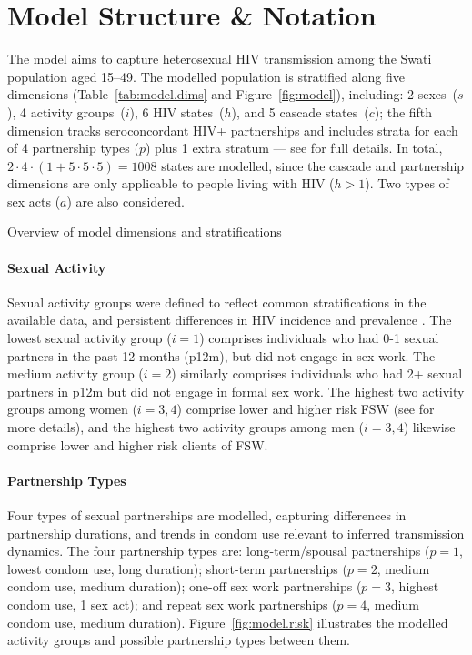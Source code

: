 \section{Model Structure \& Notation}\label{mod.str}
The model aims to capture heterosexual HIV transmission among the Swati population aged 15--49.
The modelled population is stratified along five dimensions
(Table~\ref{tab:model.dims} and Figure~\ref{fig:model}), including:
2 sexes~($s$), 4 activity groups~($i$), 6 HIV states~($h$), and 5 cascade states~($c$);
the fifth dimension tracks seroconcordant HIV+ partnerships
and includes strata for each of 4 partnership types ($p$) plus 1 extra stratum
--- see  for full details.
In total, $2 \cdot 4 \cdot (1 + 5 \cdot 5 \cdot 5) = 1008$ states are modelled,
since the cascade and partnership dimensions are only applicable to people living with HIV ($h>1$).
Two types of sex acts ($a$) are also considered.
\begin{table}[h]
  \centering
  \caption{Overview of model dimensions and stratifications}
  \label{tab:model.dims}
  
\end{table}

\paragraph{Sexual Activity}
Sexual activity groups were defined to reflect common stratifications in the available data,
and persistent differences in HIV incidence and prevalence
\cite{SDHS2006,Bicego2013,Justman2016,SHIMS2}.
The lowest sexual activity group ($i=1$) comprises
individuals who had 0-1 sexual partners in the past 12 months (p12m),
but did not engage in sex work.
The medium activity group ($i=2$) similarly comprises
individuals who had 2+ sexual partners in p12m
but did not engage in formal sex work.
The highest two activity groups among women ($i=3,4$) comprise
lower and higher risk FSW (see  for more details), and
the highest two activity groups among men ($i=3,4$) likewise comprise
lower and higher risk clients of FSW.
\paragraph{Partnership Types}
Four types of sexual partnerships are modelled,
capturing differences in partnership durations, and
trends in condom use relevant to inferred transmission dynamics.
The four partnership types are:
long-term/spousal partnerships ($p=1$, lowest condom use, long duration);
short-term partnerships ($p=2$, medium condom use, medium duration);
one-off sex work partnerships ($p=3$, highest condom use, 1 sex act);
and repeat sex work partnerships ($p=4$, medium condom use, medium duration).
Figure~\ref{fig:model.risk} illustrates
the modelled activity groups and possible partnership types between them.
